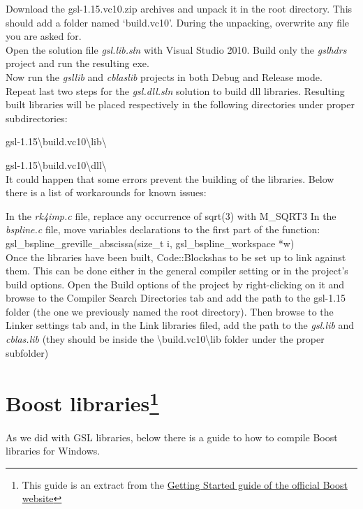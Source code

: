 \documentclass[12pt,a4paper]{report}
\begin{document}
Download the gsl-1.15.vc10.zip archives and unpack it in the root directory. This should add a folder named `build.vc10'. During the unpacking, overwrite any file you are asked for.\\

Open the solution file \emph{gsl.lib.sln} with Visual Studio 2010. Build only the \emph{gslhdrs} project and run the resulting exe. \\

Now run the \emph{gsllib} and \emph{cblaslib} projects in both Debug and Release 	 mode. \\

Repeat last two steps for the \emph{gsl.dll.sln} solution to build dll libraries.
Resulting built libraries will be placed respectively in the following directories under proper subdirectories:

gsl-1.15\textbackslash build.vc10\textbackslash lib\textbackslash

gsl-1.15\textbackslash build.vc10\textbackslash dll\textbackslash \\


It could happen that some errors prevent the building of the libraries. Below there is a list of workarounds for known issues:

In the \emph{rk4imp.c} file, replace any occurrence of sqrt(3)  with M\_SQRT3
In the \emph{bspline.c} file, move variables declarations to the first part of the function: gsl\_bspline\_greville\_abscissa(size\_t i, gsl\_bspline\_workspace *w)\\


Once the libraries have been built, Code::Blockshas to be set up to link against them. This can be done either in the general compiler setting or in the project's build options.
Open the Build options of the project by right-clicking on it and browse to the Compiler Search Directories tab and add the path to the gsl-1.15 folder (the one we previously named the root directory). Then browse to the Linker settings tab and, in the Link libraries filed, add the path to the \emph{gsl.lib} and \emph{cblas.lib} (they should be inside the \textbackslash build.vc10\textbackslash lib folder under the proper subfolder)

\section*{Boost libraries\footnote{This guide is an extract from the \href{http://www.boost.org/doc/libs/1_53_0/more/getting_started/windows.html}{Getting Started guide of the official Boost website}}}
As we did with GSL libraries, below there is a guide to how to compile Boost libraries for Windows.
\end{document}
